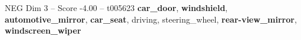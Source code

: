 \begin{textsample}{NEG Dim 3 – Score -4.00 – t005623}  \label{ex:f3_neg_037}
\textbf{car\_door}, \textbf{windshield}, \textbf{automotive\_mirror}, \textbf{car\_seat}, driving, steering\_wheel, \textbf{rear-view\_mirror}, \textbf{windscreen\_wiper}

\end{textsample}
